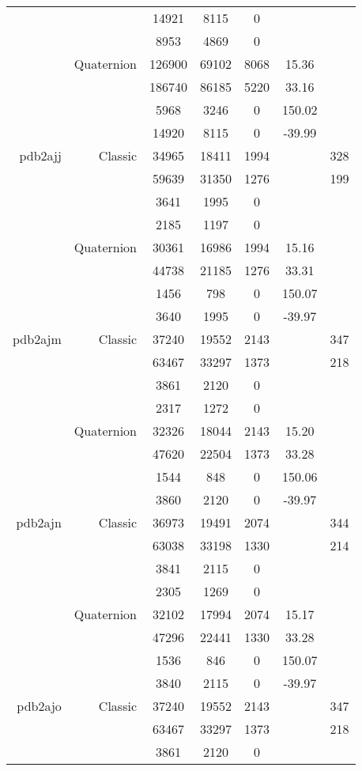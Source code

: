 \begin{xltabular}{\textwidth}{r|rcccSc}
& & 14921 & 8115 & 0 & & \\
& & 8953 & 4869 & 0 & & \\
& Quaternion & 126900 & 69102 & 8068 & 15.36 & \\
& & 186740 & 86185 & 5220 & 33.16 & \\
& & 5968 & 3246 & 0 & 150.02 & \\
& & 14920 & 8115 & 0 & -39.99 & \\ \addlinespace
pdb2ajj & Classic & 34965 & 18411 & 1994 & & 328 \\
& & 59639 & 31350 & 1276 & & 199 \\
& & 3641 & 1995 & 0 & & \\
& & 2185 & 1197 & 0 & & \\
& Quaternion & 30361 & 16986 & 1994 & 15.16 & \\
& & 44738 & 21185 & 1276 & 33.31 & \\
& & 1456 & 798 & 0 & 150.07 & \\
& & 3640 & 1995 & 0 & -39.97 & \\ \addlinespace
pdb2ajm & Classic & 37240 & 19552 & 2143 & & 347 \\
& & 63467 & 33297 & 1373 & & 218 \\
& & 3861 & 2120 & 0 & & \\
& & 2317 & 1272 & 0 & & \\
& Quaternion & 32326 & 18044 & 2143 & 15.20 & \\
& & 47620 & 22504 & 1373 & 33.28 & \\
& & 1544 & 848 & 0 & 150.06 & \\
& & 3860 & 2120 & 0 & -39.97 & \\ \addlinespace
pdb2ajn & Classic & 36973 & 19491 & 2074 & & 344 \\
& & 63038 & 33198 & 1330 & & 214 \\
& & 3841 & 2115 & 0 & & \\
& & 2305 & 1269 & 0 & & \\
& Quaternion & 32102 & 17994 & 2074 & 15.17 & \\
& & 47296 & 22441 & 1330 & 33.28 & \\
& & 1536 & 846 & 0 & 150.07 & \\
& & 3840 & 2115 & 0 & -39.97 & \\ \addlinespace
pdb2ajo & Classic & 37240 & 19552 & 2143 & & 347 \\
& & 63467 & 33297 & 1373 & & 218 \\
& & 3861 & 2120 & 0 & & \\

\end{xltabular}
